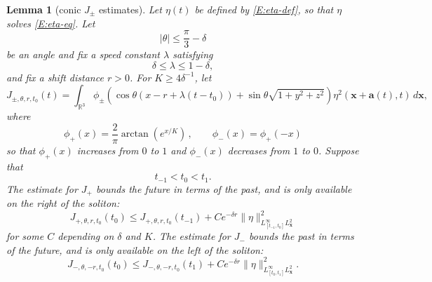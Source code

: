 \documentclass[12pt,letterpaper]{amsart}
\newtheorem{lemma}[theorem]{Lemma}
\theoremstyle{remark}
\numberwithin{equation}{section}
\numberwithin{theorem}{section}
\numberwithin{table}{section}
\begin{document}
\begin{lemma}[conic $J_\pm$ estimates]
\label{L:Jpm-estimates}
Let $\eta(t)$ be defined by \eqref{E:eta-def}, so that $\eta$ solves \eqref{E:eta-eq}.  Let 
$$
|\theta| \leq \frac{\pi}{3}-\delta
$$ 
be an angle and fix a speed constant $\lambda$ satisfying 
\begin{equation}
\label{E:mon4J}
\delta \leq \lambda \leq 1-\delta,
\end{equation}
and fix a shift distance $r>0$.  For $K\geq 4\delta^{-1}$, let
\begin{equation}
\label{E:J-def}
J_{\pm, \theta, r, t_0} (t) = \int_{\mathbb{R}^3} \phi_\pm \left(  \cos \theta(x-r+\lambda(t-t_0)) +  \sin \theta \sqrt{1+y^2+z^2} \right) \eta^2(\mathbf{x}+\mathbf{a}(t), t) \, d\mathbf{x},
\end{equation}
where
$$
\phi_+(x) = \frac{2}{\pi} \operatorname{arctan}(e^{x/K}) \,, \qquad \phi_-(x) = \phi_+(-x)
$$
so that $\phi_+(x)$ increases from $0$ to $1$ and $\phi_-(x)$ decreases from $1$ to $0$.  
Suppose that 
$$
t_{-1}<t_0<t_1.
$$
The estimate for $J_+$ bounds the \emph{future in terms of the past}, and is only available on the right of the soliton:
\begin{equation}
\label{E:Jp-right}
J_{+,\theta, r,t_0}(t_0) \leq J_{+,\theta, r,t_0}(t_{-1}) + C e^{-\delta r} \| \eta \|_{L_{[t_{-1},t_0]}^\infty L_{\mathbf{x}}^2}^2 
\end{equation}
for some $C$ depending on $\delta$ and $K$.   The estimate for $J_-$ bounds the \emph{past in terms of the future}, and is only available on the left of the soliton:
\begin{equation}
\label{E:Jm-left}
J_{-,\theta,-r,t_0}(t_0) \leq J_{-,\theta,-r,t_0}(t_1) + Ce^{-\delta r} \| \eta \|_{L_{[t_0,t_1]}^\infty L_{\mathbf{x}}^2}^2. 
\end{equation}
\end{lemma}
\end{document}

